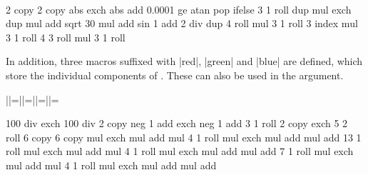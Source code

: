 \begin{command}{\pgfdeclarefunctionalshading{}\\
    }
\begin{command}{\pgfshadecolortorgb{}}
\begin{codeexample}[]
{\pgfpoint{1cm}{1cm}}{}{
  2 copy        %
  2 copy abs exch abs add 0.0001 ge { atan } { pop } ifelse
  3 1 roll
  dup mul exch
  dup mul add sqrt
  30 mul
  add
  sin
  1 add 2 div  
  dup
   4 roll      %
  mul
  3 1 roll
  3 index
  mul
  3 1 roll
  4 3 roll
  mul
  3 1 roll
}
%
%
%
\end{codeexample}


In addition, three macros suffixed with |red|, |green| and |blue| 
are defined, which store the individual components of 
. These can also
be used in the  argument.
  
\begin{codeexample}[]
|\mycol|=\mycol |\mycolred|=\mycolred |\mycolgreen|=\mycolgreen |\mycolblue|=\mycolblue
\end{codeexample}
\end{command}

\begin{codeexample}[]
{\pgfpointorigin}{\pgfpoint{100bp}{100bp}}
{
}{
  100 div exch 100 div 2 copy                   %
  neg 1 add exch neg 1 add                      %
  3 1 roll 2 copy exch 5 2 roll 6 copy 6 copy   %
  \firstred mul exch \secondred mul add mul     %
  4 1 roll
  \thirdred mul exch \fourthred mul add mul
  add
  13 1 roll
  \firstgreen mul exch \secondgreen mul add mul %
  4 1 roll
  \thirdgreen mul exch \fourthgreen mul add mul
  add
  7 1 roll
  \firstblue mul exch \secondblue mul add mul   %
  4 1 roll
  \thirdblue mul exch \fourthblue mul add mul
  add
}

\end{codeexample}
\end{command}


